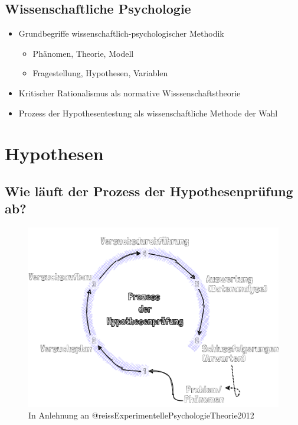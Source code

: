 \documentclass[
]{book}
\begin{document}
\hypertarget{wissenschaftliche-psychologie-1}{%
\subsection{Wissenschaftliche Psychologie}\label{wissenschaftliche-psychologie-1}}

\begin{itemize}
\item
  Grundbegriffe wissenschaftlich-psychologischer Methodik

  \begin{itemize}
  \item
    Phänomen, Theorie, Modell
  \item
    Fragestellung, Hypothesen, Variablen
  \end{itemize}
\item
  Kritischer Rationalismus als normative Wisssenschaftstheorie
\item
  Prozess der Hypothesentestung als wissenschaftliche Methode der Wahl
\end{itemize}

\hypertarget{hypothesen-1}{%
\section{Hypothesen}\label{hypothesen-1}}

\hypertarget{wie-luxe4uft-der-prozess-der-hypothesenpruxfcfung-ab}{%
\subsection{Wie läuft der Prozess der Hypothesenprüfung ab?}\label{wie-luxe4uft-der-prozess-der-hypothesenpruxfcfung-ab}}

\begin{figure}

{\centering \includegraphics[width=0.5\linewidth]{imgs/Hypothesen} 

}

\caption{In Anlehnung an @reissExperimentellePsychologieTheorie2012}\label{fig:unnamed-chunk-20}
\end{figure}
\end{document}
